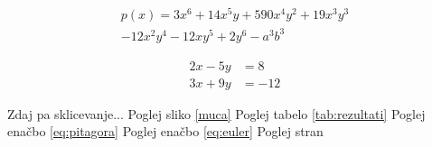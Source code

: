 \documentclass[a4paper,10pt]{article}
\begin{document}
\begin{multline*} %
p(x) = 3x^6 + 14x^5y + 590x^4y^2 + 19x^3y^3\\ 
- 12x^2y^4 - 12xy^5 + 2y^6 - a^3b^3
\end{multline*}

\begin{align*} %
2x - 5y &=  8 \\ 
3x + 9y &=  -12
\end{align*}

Zdaj pa sklicevanje... \bigbreak %
Poglej sliko \ref{muca}
\bigbreak
Poglej tabelo \ref{tab:rezultati}
\bigbreak
Poglej enačbo \eqref{eq:pitagora}
\bigbreak
Poglej enačbo \eqref{eq:euler}
\bigbreak
Poglej stran \pageref{eq:pitagora}
\bigbreak
\end{document}
